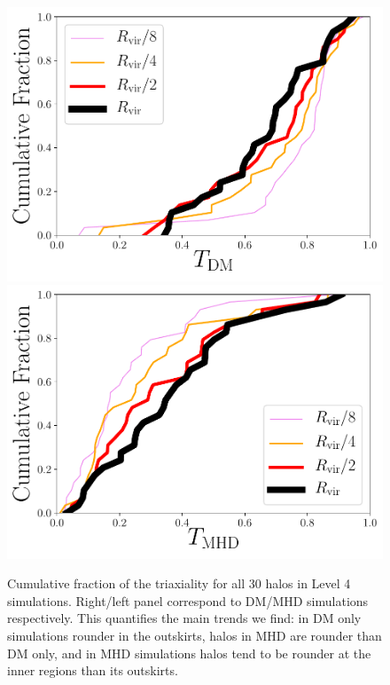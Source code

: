 \documentclass[a4paper,fleqn,usenatbib]{mnras}
\begin{document}
\begin{figure}
\includegraphics[width=0.9\columnwidth]{triaxialiy_distro_DM.pdf}
\includegraphics[width=0.9\columnwidth]{triaxialiy_distro_MHD.pdf}
\caption{Cumulative fraction of the triaxiality for all 30 halos in
  Level 4 simulations. Right/left panel correspond to DM/MHD
  simulations respectively. 
  This quantifies the main trends we find: in DM only simulations
  rounder in the outskirts, halos in MHD are rounder than DM only, and
  in MHD simulations halos tend to be rounder at the inner regions
  than its outskirts.}
\label{fig:triaxial_cumulative}
\end{figure}



\end{document}
